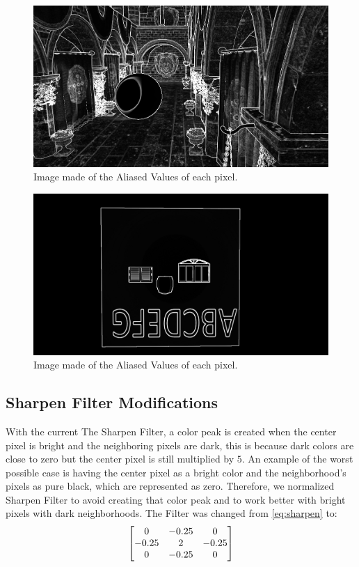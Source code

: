 \documentclass{cslthse-msc}
\begin{document}
\begin{figure}[H]
	\centering
	\includegraphics[scale=0.2]{images/aliased_value_example_2_temporal.png}
	\caption{Image made of the Aliased Values of each pixel.}\label{fig:aliasedval2}
\end{figure}

\begin{figure}[H]
	\centering
	\includegraphics[scale=0.2]{images/aliased_value_example_3_temporal.png}
	\caption{Image made of the Aliased Values of each pixel.}\label{fig:aliasedval3}
\end{figure}

\subsection{Sharpen Filter Modifications}
With the current The Sharpen Filter, a color peak is created when the center pixel is bright and the neighboring pixels are dark, this is because dark colors are close to zero but the center pixel is still multiplied by $5$. An example of the worst possible case is having the center pixel as a bright color and the neighborhood’s pixels as pure black, which are represented as zero. Therefore, we normalized Sharpen Filter to avoid creating that color peak and to work better with bright pixels with dark neighborhoods. The Filter was changed from \ref{eq:sharpen} to:
\begin{equation} \label{eq:new_sharpen}
\centering
\begin{bmatrix*}[c]
0 & -0.25 &  0 \\
-0.25  &  2 & -0.25  \\
0 & -0.25  &  0
\end{bmatrix*}
\end{equation}
\end{document}
